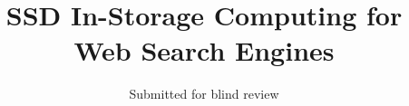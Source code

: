 

\title{SSD In-Storage Computing for Web Search Engines}


\author{Submitted for blind review}
\maketitle



















